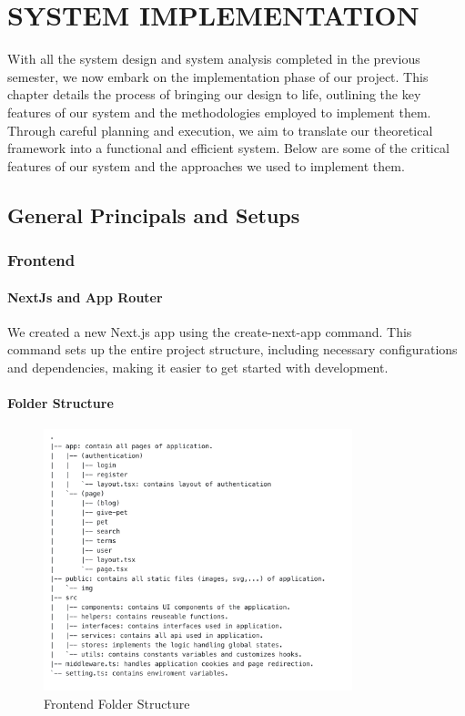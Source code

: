 \chapter{SYSTEM IMPLEMENTATION}
With all the system design and system analysis completed in the previous semester, we now embark on the implementation phase of our project. This chapter details the process of bringing our design to life, outlining the key features of our system and the methodologies employed to implement them. Through careful planning and execution, we aim to translate our theoretical framework into a functional and efficient system. Below are some of the critical features of our system and the approaches we used to implement them.

\section{General Principals and Setups}
\subsection{Frontend}

\subsubsection*{NextJs and App Router}
We created a new Next.js app using the create-next-app command. This command sets up the entire project structure, including necessary configurations and dependencies, making it easier to get started with development.


\subsubsection*{Folder Structure}
\begin{figure}[H]
    \centering
    \includegraphics[width=0.8\textwidth]{Figures/Implementation/folder_fe.png}
    \caption{Frontend Folder Structure}
    \label{fig:folder-structure-fe}
\end{figure}

